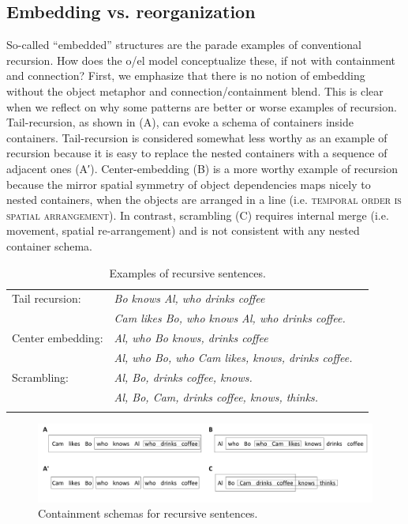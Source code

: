 \subsection{Embedding vs. reorganization}

So-called “embedded” structures are the parade examples of conventional recursion. How does the o/el model conceptualize these, if not with containment and connection? First, we emphasize that there is no notion of embedding without the object metaphor and connection/containment blend. This is clear when we reflect on why some patterns are better or worse examples of recursion. Tail-recursion, as shown in {}(A), can evoke a schema of containers inside containers. Tail-recursion is considered somewhat less worthy as an example of recursion because it is easy to replace the nested containers with a sequence of adjacent ones (A′). Center-embedding (B) is a more worthy example of recursion because the mirror spatial symmetry of object dependencies maps nicely to nested containers, when the objects are arranged in a line (i.e. \textsc{temporal order is spatial arrangement}). In contrast, scrambling (C) requires internal merge (i.e. movement, spatial re-arrangement) and is not consistent with any nested container schema.

\begin{table}
\begin{tabularx}{\textwidth}{lQQ}
\lsptoprule
Tail recursion: & \textit{Bo knows Al, who drinks coffee} \\
 & \textit{Cam likes Bo, who knows Al, who drinks coffee.}\\
Center embedding: & \textit{Al, who Bo knows, drinks coffee}\\
 & \textit{Al, who Bo, who Cam likes, knows, drinks coffee.}\\
Scrambling: & \textit{Al, Bo, drinks coffee, knows.}\\
 & \textit{Al, Bo, Cam, drinks coffee, knows, thinks.}\\
\lspbottomrule
\end{tabularx}
\caption{Examples of recursive sentences.}\label{tab:5:3}
\end{table}
  
\begin{figure}
\includegraphics[width=\textwidth]{figures/Tilsen-img118.png}
\caption{Containment schemas for recursive sentences.}
\label{fig:5:14}
\end{figure}
 

